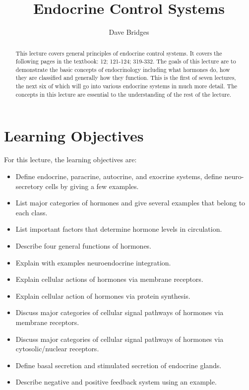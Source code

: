 \documentclass{tufte-handout}
\title{Endocrine Control Systems}
\author{Dave Bridges}
\begin{document}
\maketitle%

\begin{abstract}
\noindent This lecture covers general principles of endocrine control systems.  It covers the following pages in the textbook: 12; 121-124; 319-332\cite{Widmaier2013}.  The goals of this lecture are to demonstrate the basic concepts of endocrinology including what hormones do, how they are classified and generally how they function.  This is the first of seven lectures, the next six of which will go into various endocrine systems in much more detail.  The concepts in this lecture are essential to the understanding of the rest of the lecture.
\end{abstract}

\tableofcontents

\pagebreak

\section{Learning Objectives}
For this lecture, the learning objectives are:
\begin{itemize}
\item Define endocrine, paracrine, autocrine, and exocrine systems, define neuro-secretory cells by giving a few examples.
\item List major categories of hormones and give several examples that belong to each class.
\item List important factors that determine hormone levels in circulation.
\item Describe four general functions of hormones.
\item Explain with examples neuroendocrine integration.
\item Explain cellular actions of hormones via membrane receptors.
\item Explain cellular action of hormones via protein synthesis.
\item Discuss major categories of cellular signal pathways of hormones via membrane receptors.
\item Discuss major categories of cellular signal pathways of hormones via cytosolic/nuclear receptors.
\item Define basal secretion and stimulated secretion of endocrine glands.
\item Describe negative and positive feedback system using an example.
\end{itemize}
\end{document}
